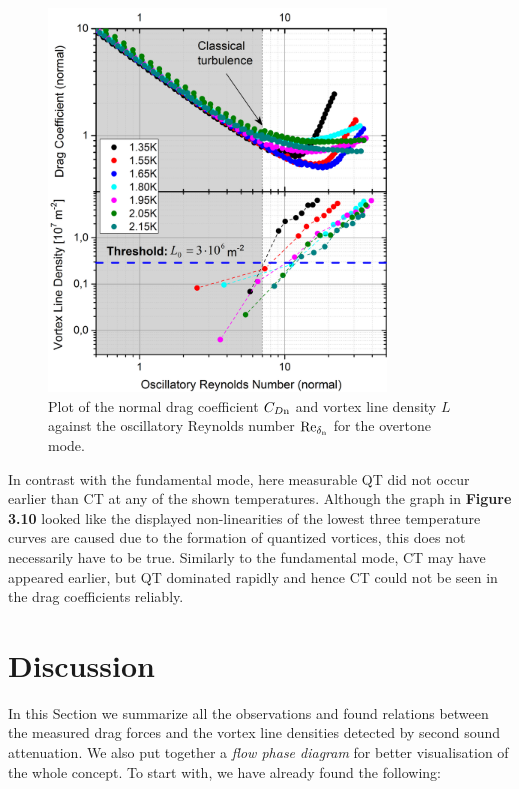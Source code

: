 \newpage

\begin{figure}[h!]
	\centering
	\includegraphics[width=0.8\textwidth]{graphs/Merged_C+L_Ren_over}
	\caption{Plot of the normal drag coefficient $ C_{D\mathrm{n}} $ and vortex line density $ L $ against the oscillatory Reynolds number $ \text{Re}_{\delta_{\mathrm{n}}} $ for the overtone mode.}
\end{figure}

In contrast with the fundamental mode, here measurable QT did not occur earlier than CT at any of the shown temperatures. Although the graph in {\sffamily\textbf{Figure 3.10}} looked like the displayed non-linearities of the lowest three temperature curves are caused due to the formation of quantized vortices, this does not necessarily have to be true. Similarly to the fundamental mode, CT may have appeared earlier, but QT dominated rapidly and hence CT could not be seen in the drag coefficients reliably.

\newpage

\section{Discussion}

In this Section we summarize all the observations and found relations between the measured drag forces and the vortex line densities detected by second sound attenuation. We also put together a \textit{flow phase diagram} for better visualisation of the whole concept. To start with, we have already found the following:

